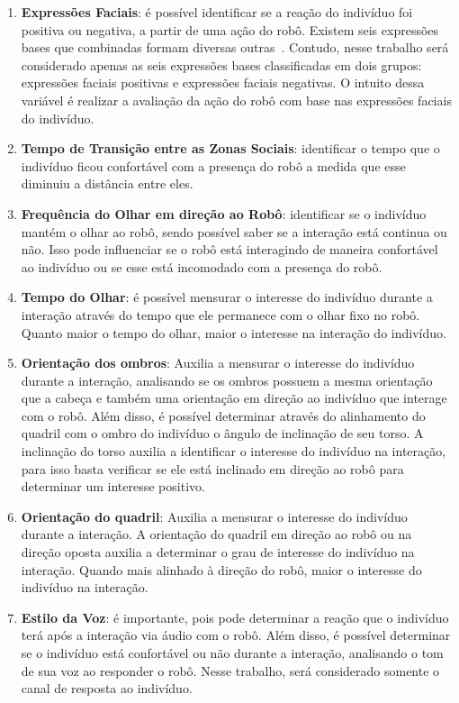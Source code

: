 \begin{enumerate}
	\item \textbf{Expressões Faciais}: é possível identificar se a reação do indivíduo foi positiva ou negativa, a partir de uma ação do robô. Existem seis expressões bases que combinadas formam diversas outras~\cite{bihan:2014}. Contudo, nesse trabalho será considerado apenas as seis expressões bases classificadas em dois grupos: expressões faciais positivas e expressões faciais negativas. O intuito dessa variável é realizar a avaliação da ação do robô com base nas expressões faciais do indivíduo.
	\item \textbf{Tempo de Transição entre as Zonas Sociais}: identificar o tempo que o indivíduo ficou confortável com a presença do robô a medida que esse diminuiu a distância entre eles.
	\item \textbf{Frequência do Olhar em direção ao Robô}: identificar se o indivíduo mantém o olhar ao robô, sendo possível saber se a interação está continua ou não. Isso pode influenciar se o robô está interagindo de maneira confortável ao indivíduo ou se esse está incomodado com a presença do robô.
	\item \textbf{Tempo do Olhar}: é possível mensurar o interesse do indivíduo durante a interação através do tempo que ele permanece com o olhar fixo no robô. Quanto maior o tempo do olhar, maior o interesse na interação do indivíduo.
	\item \textbf{Orientação dos ombros}: Auxilia a mensurar o interesse do indivíduo durante a interação, analisando se os ombros possuem a mesma orientação que a cabeça e também uma orientação em direção ao indivíduo que interage com o robô. Além disso, é possível determinar através do alinhamento do quadril com o ombro do indivíduo o ângulo de inclinação de seu torso. A inclinação do torso auxilia a identificar o interesse do indivíduo na interação, para isso basta verificar se ele está inclinado em direção ao robô para determinar um interesse positivo.
	\item \textbf{Orientação do quadril}: Auxilia a mensurar o interesse do indivíduo durante a interação. A orientação do quadril em direção ao robô ou na direção oposta auxilia a determinar o grau de interesse do indivíduo na interação. Quando mais alinhado à direção do robô, maior o interesse do indivíduo na interação.
	\item \textbf{Estilo da Voz}: é importante, pois pode determinar a reação que o indivíduo terá após a interação via áudio com o robô. Além disso, é possível determinar se o indivíduo está confortável ou não durante a interação, analisando o tom de sua voz ao responder o robô. Nesse trabalho, será considerado somente o canal de resposta ao indivíduo.

\end{enumerate}
